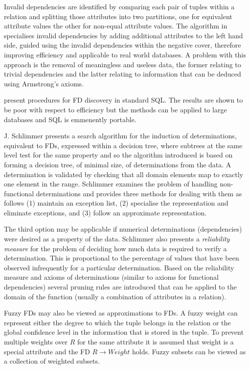 Invalid dependencies are identified by comparing each pair of tuples
within a relation and splitting those attributes into two partitions,
one for equivalent attribute values the other for non-equal attribute
values.  The algorithm in \cite{sf93} specialises invalid dependencies
by adding additional attributes to the left hand side, guided using
the invalid dependencies within the negative cover, therefore
improving efficiency and applicable to real world databases. A problem
with this approach is the removal of meaningless and useless data, the
former relating to trivial dependencies and the latter relating to
information  that can be deduced using Armstrong's axioms.

\cite{bb95} present procedures for FD discovery in standard SQL. The
results are shown to be poor with respect to efficiency but the
methods can be applied to large databases and SQL is emmenently portable.

J. Schlimmer presents a search algorithm \cite{schl93} for the induction of 
determinations, equivalent to FDs, expressed within a decision tree,
where subtrees at
the same level test for the same property and so the algorithm
introduced is based on forming a decision tree, of minimal
size, of determinations from the data. A determination is  validated
by checking that all domain elements
map to exactly one element in the range.  Schlimmer examines the
problem of handling non-functional determinations and provides
three methods for dealing with them as follows (1) maintain an exception list, 
 (2) specialise the representation and eliminate exceptions, and (3)
follow an approximate representation.

The third option may be applicable if numerical determinations 
(dependencies) were desired as a property of the data.  Schlimmer also
presents a {\em reliability measure} for the problem of  deciding how
much data is required to verify a determination.  This is proportional
to the percentage of values that have been observed infrequently
for a particular determination.  Based on the reliability measure and
axioms of determinations (similar to axioms for functional dependencies)
several pruning rules are introduced that can be applied to the domain
of the function (usually a combination of attributes in a relation).

Fuzzy FDs \cite{bdp94,hfs94} may also be viewed as approximations to FDs.
A fuzzy weight can represent either the degree to which the tuple
belongs in the relation or the global confidence level in the
information that is stored in the tuple. To prevent multiple weights
over $R$ for the same attribute it is assumed that weight is a special
attribute and the FD $R \to Weight$ holds.  Fuzzy subsets can be
viewed as a collection of weighted subsets. \\


